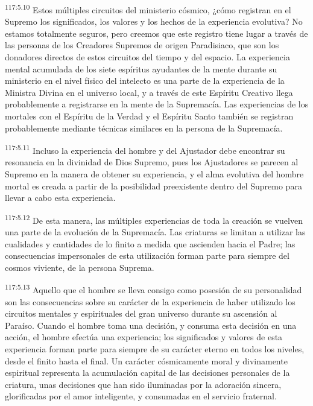 \documentclass[twoside, 11pt]{book}
\begin{document}
\par
\textsuperscript{117:5.10} Estos múltiples circuitos del ministerio cósmico, ¿cómo registran en el Supremo los significados, los valores y los hechos de la experiencia evolutiva? No estamos totalmente seguros, pero creemos que este registro tiene lugar a través de las personas de los Creadores Supremos de origen Paradisiaco, que son los donadores directos de estos circuitos del tiempo y del espacio. La experiencia mental acumulada de los siete espíritus ayudantes de la mente durante su ministerio en el nivel físico del intelecto es una parte de la experiencia de la Ministra Divina en el universo local, y a través de este Espíritu Creativo llega probablemente a registrarse en la mente de la Supremacía. Las experiencias de los mortales con el Espíritu de la Verdad y el Espíritu Santo también se registran probablemente mediante técnicas similares en la persona de la Supremacía.

\par
\textsuperscript{117:5.11} Incluso la experiencia del hombre y del Ajustador debe encontrar su resonancia en la divinidad de Dios Supremo, pues los Ajustadores se parecen al Supremo en la manera de obtener su experiencia, y el alma evolutiva del hombre mortal es creada a partir de la posibilidad preexistente dentro del Supremo para llevar a cabo esta experiencia.

\par
\textsuperscript{117:5.12} De esta manera, las múltiples experiencias de toda la creación se vuelven una parte de la evolución de la Supremacía. Las criaturas se limitan a utilizar las cualidades y cantidades de lo finito a medida que ascienden hacia el Padre; las consecuencias impersonales de esta utilización forman parte para siempre del cosmos viviente, de la persona Suprema.

\par
\textsuperscript{117:5.13} Aquello que el hombre se lleva consigo como posesión de su personalidad son las consecuencias sobre su carácter de la experiencia de haber utilizado los circuitos mentales y espirituales del gran universo durante su ascensión al Paraíso. Cuando el hombre toma una decisión, y consuma esta decisión en una acción, el hombre efectúa una experiencia; los significados y valores de esta experiencia forman parte para siempre de su carácter eterno en todos los niveles, desde el finito hasta el final. Un carácter cósmicamente moral y divinamente espiritual representa la acumulación capital de las decisiones personales de la criatura, unas decisiones que han sido iluminadas por la adoración sincera, glorificadas por el amor inteligente, y consumadas en el servicio fraternal.
\end{document}
